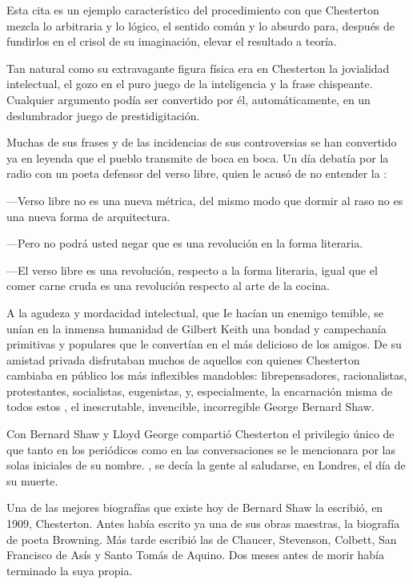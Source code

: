 Esta cita es un ejemplo característico del procedimiento con que Chesterton mezcla lo arbitraria y lo
lógico, el sentido común y lo absurdo para, después de fundirlos en el crisol de su imaginación, elevar el
resultado a teoría.

Tan natural como su extravagante figura física era en Chesterton la jovialidad intelectual, el gozo en
el puro juego de la inteligencia y la frase chispeante. Cualquier argumento podía ser convertido por él,
automáticamente, en un deslumbrador juego de prestidigitación.

Muchas de sus frases y de las incidencias de sus controversias se han convertido ya en leyenda que
el pueblo transmite de boca en boca. Un día debatía por la radio con un poeta defensor del verso libre,
quien le acusó de no entender la :

---Verso libre no es una nueva métrica, del mismo modo que dormir al
raso no es una nueva forma de arquitectura.

---Pero no podrá usted negar que es una revolución en la forma literaria.
	
---El verso libre es una revolución, respecto a la forma literaria, igual que el comer carne cruda es una
revolución respecto al arte de la cocina.

A la agudeza y mordacidad intelectual, que Ie hacían un enemigo temible, se unían en la inmensa
humanidad de Gilbert Keith una bondad y campechanía primitivas y populares que le convertían en el
más delicioso de los amigos. De su amistad privada disfrutaban muchos de aquellos con quienes
Chesterton cambiaba en público los más inflexibles mandobles: librepensadores, racionalistas,
protestantes, socialistas, eugenistas, y, especialmente, la encarnación misma de todos estos , el
inescrutable, invencible, incorregible George Bernard Shaw.

Con Bernard Shaw y Lloyd George compartió Chesterton el privilegio único de que tanto en los
periódicos como en las conversaciones se le mencionara por las solas iniciales de su nombre. , se decía la gente al saludarse, en Londres, el día de su muerte.

Una de las mejores biografías que existe hoy de Bernard Shaw la escribió, en 1909, Chesterton.
Antes había escrito ya una de sus obras maestras, la biografía de poeta Browning.
Más tarde escribió las de Chaucer, Stevenson, Colbett, San Francisco de Asís y Santo Tomás de
Aquino. Dos meses antes de morir había terminado la suya propia.

